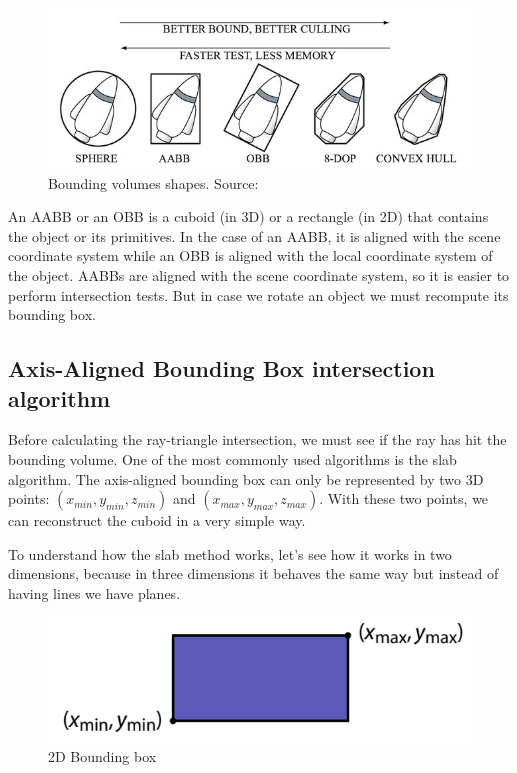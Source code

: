\documentclass[titlepage,12pt]{report}
\begin{document}
\begin{figure}[!ht]
	\centering
	\includegraphics[scale=1.25]{media/volumes.jpg}
	\caption{Bounding volumes shapes. Source: \citep[pp.~236–237]{Ericson2004}}
	\label{BV}
\end{figure}


An AABB or an OBB is a cuboid (in 3D) or a rectangle (in 2D) that contains the object or its primitives. In the case of an AABB, it is aligned with the scene coordinate system while an OBB is aligned with the local coordinate system of the object. AABBs are aligned with the scene coordinate system, so it is easier to perform intersection tests. But in case we rotate an object we must recompute its bounding box.

\subsection{Axis-Aligned Bounding Box intersection algorithm}

Before calculating the ray-triangle intersection, we must see if the ray has hit the bounding volume. One of the most commonly used algorithms is the slab algorithm. The axis-aligned bounding box can only be represented by two 3D points: $(x_{min},y_{min},z_{min})$ and $(x_{max},y_{max},z_{max})$. With these two points, we can reconstruct the cuboid in a very simple way. 

To understand how the slab method works, let's see how it works in two dimensions, because in three dimensions it behaves the same way but instead of having lines we have planes.

\begin{figure}[!ht]
	\centering
	\includegraphics[scale=0.5]{media/slab_1.png}
	\caption{2D Bounding box}
	\label{AABB1}
\end{figure}
\end{document}
